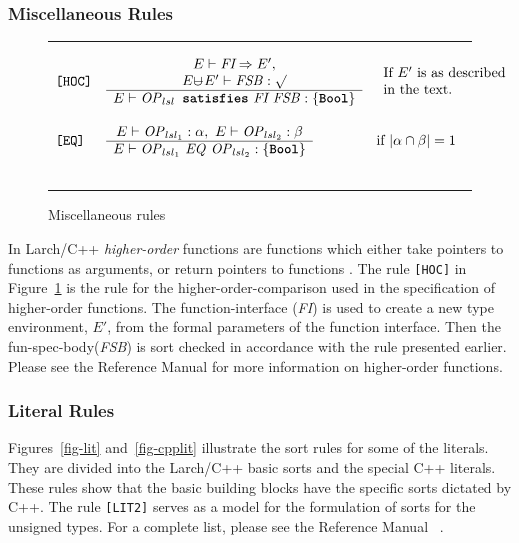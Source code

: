 \documentclass[12pt]{article} %
\newcommand{\reserved}[1]{\textbf{\texttt{#1}}} %
\newcommand{\RULELAB}[1]{\texttt{#1}}
\newcommand{\uminus}{\mbox{$\cup\!\!\!\!-$}}
\newcommand{\UNSPACEFORBOX}{\vspace{-2ex}}
\newcommand{\HLINE}{\UNSPACEFORBOX%
\begin{flushleft}\rule{\textwidth}{0.01in}\end{flushleft}%
\UNSPACEFORBOX}
\newenvironment{BFIGURE}{

\begin{figure}
\small
\HLINE
}{
\HLINE
\normalsize
\end{figure}
}
\begin{document}
\subsubsection{Miscellaneous Rules}
\label{miscrules}
\begin{BFIGURE}
\begin{displaymath}
\begin{array}{lll}
\RULELAB{[HOC]} &
\begin{array}{c}
E \vdash \mbox{\it FI} \Rightarrow E',\\
E \uminus E'\vdash \mbox{\textit{FSB}}: \surd \\
\hline
E \vdash \mbox{\textit{OP}$_{lsl}$}\mbox{\reserved{ satisfies} \textit{FI FSB}}:\{\reserved{Bool}\}
\end{array}
&
\begin{array}{l}
\mbox{If $E'$ is as described } \\
\mbox{in the text.}
\end{array}
\\
~\\
\RULELAB{[EQ]} &
\begin{array}{c}
E \vdash \mbox{\textit{OP}$_{{lsl}_1}$}:\alpha,~E \vdash \mbox{\textit{OP}$_{{lsl}_2}$}:\beta \\
\hline
E \vdash \mbox{\textit{OP}$_{{lsl}_1}$ \textit{EQ} \textit{OP}$_{{lsl}_2}$}:\{\reserved{Bool}\}
\end{array}
&
\mbox{if $| \alpha \cap  \beta | = 1$}
\\
~\\
\end{array}
\end{displaymath}
\caption{Miscellaneous rules}
\label{fig-three}
\end{BFIGURE}
In Larch/C++ \emph{higher-order} functions are functions which either
take pointers to functions as arguments, or return pointers to
functions \cite{Leavens96c}. The rule \RULELAB{[HOC]} in
Figure~\ref{fig-three} is the rule for the higher-order-comparison
used in the specification of higher-order functions. The
function-interface (\textit{FI}) is used to create a new type
environment, $E'$, from the formal parameters of the function
interface. Then the fun-spec-body(\textit{FSB}) is sort checked in
accordance with the rule presented earlier. Please see the Reference
Manual \cite[Section 6.12]{Leavens96c} for more information on
higher-order functions.

\subsubsection{Literal Rules}
Figures~\ref{fig-lit} and~\ref{fig-cpplit} illustrate the sort rules
for some of the literals. They are divided into the Larch/C++ basic
sorts and the special C++ literals. These rules show that the basic
building blocks have the specific sorts dictated by C++. The rule
\RULELAB{[LIT2]} serves as a model for the formulation of sorts for
the unsigned types. For a complete list, please see the Reference
Manual ~\cite[Chapter 11]{Leavens96c}.
\end{document}
